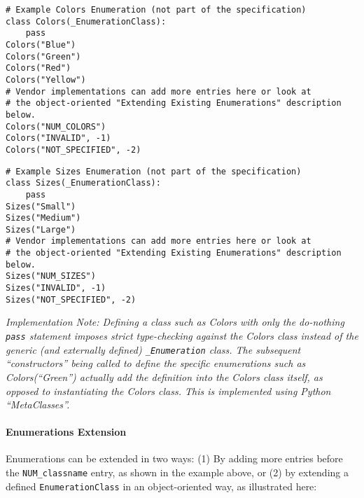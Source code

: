 \documentclass[12pt]{report} %
\begin{document}
\begin{appendices}
\begin{center}\begin{minipage}{.95\linewidth}\begin{lstlisting}
# Example Colors Enumeration (not part of the specification)
class Colors(_EnumerationClass):
    pass
Colors("Blue")
Colors("Green")
Colors("Red")
Colors("Yellow")
# Vendor implementations can add more entries here or look at
# the object-oriented "Extending Existing Enumerations" description below.
Colors("NUM_COLORS")
Colors("INVALID", -1)
Colors("NOT_SPECIFIED", -2)
\end{lstlisting}\end{minipage}\end{center}

\begin{center}\begin{minipage}{.95\linewidth}\begin{lstlisting}
# Example Sizes Enumeration (not part of the specification)
class Sizes(_EnumerationClass):
    pass
Sizes("Small")
Sizes("Medium")
Sizes("Large")
# Vendor implementations can add more entries here or look at
# the object-oriented "Extending Existing Enumerations" description below.
Sizes("NUM_SIZES")
Sizes("INVALID", -1)
Sizes("NOT_SPECIFIED", -2)
\end{lstlisting}\end{minipage}\end{center}

\emph{Implementation Note: Defining a class such as Colors with only the
do-nothing \texttt{pass} statement imposes strict type-checking against the
Colors class instead of the generic (and externally defined) \texttt{_Enumeration}
class. The subsequent ``constructors'' being called to define the specific
enumerations such as Colors(``Green'') actually add the definition into
the Colors class itself, as opposed to instantiating the Colors
class. This is implemented using Python ``MetaClasses''.}

\paragraph{Enumerations Extension}\label{sec:EnumerationsExtension}

Enumerations can be extended in two ways: (1) By adding more entries before the
\texttt{NUM_classname} entry, as shown in the example above, or (2) by extending a
defined \texttt{EnumerationClass} in an object-oriented way, as illustrated here:


\end{appendices}
\end{document}
